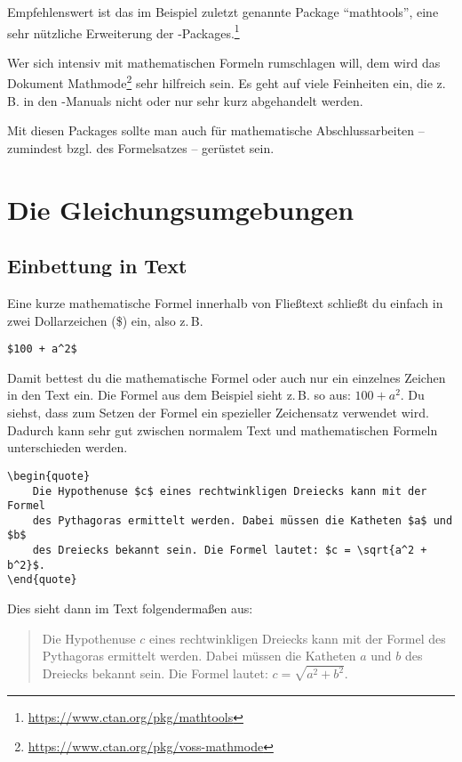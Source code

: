 Empfehlenswert ist das im Beispiel zuletzt genannte Package \enquote{mathtools}, eine sehr nützliche Erweiterung der \AmSmath-Packages.\footnote{\href{https://www.ctan.org/pkg/mathtools}{https://www.ctan.org/pkg/mathtools}}

Wer sich intensiv mit mathematischen Formeln rumschlagen will, dem wird das Dokument Mathmode\footnote{\href{https://www.ctan.org/pkg/voss-mathmode}{https://www.ctan.org/pkg/voss-mathmode}} sehr hilfreich sein. Es geht auf viele Feinheiten ein, die z.\,B. in den \AmSmath-Manuals nicht oder nur sehr kurz abgehandelt werden.

Mit diesen Packages sollte man auch für mathematische Abschlussarbeiten -- zumindest bzgl. des Formelsatzes -- gerüstet sein.

\section{Die Gleichungsumgebungen}
\subsection{Einbettung in Text}

Eine kurze mathematische Formel innerhalb von Fließtext schließt du einfach in zwei Dollarzeichen (\$) ein, also z.\,B.
\begin{lstlisting}
$100 + a^2$
\end{lstlisting}

Damit bettest du die mathematische Formel oder auch nur ein einzelnes Zeichen in den Text ein. Die Formel aus dem Beispiel sieht z.\,B. so aus: $100 + a^2$. Du siehst, dass zum Setzen der Formel ein spezieller Zeichensatz verwendet wird. Dadurch kann sehr gut zwischen normalem Text und mathematischen Formeln unterschieden werden.
\begin{lstlisting}
\begin{quote}
	Die Hypothenuse $c$ eines rechtwinkligen Dreiecks kann mit der Formel 
	des Pythagoras ermittelt werden. Dabei müssen die Katheten $a$ und $b$
	des Dreiecks bekannt sein. Die Formel lautet: $c = \sqrt{a^2 + b^2}$. 
\end{quote}
\end{lstlisting}

Dies sieht dann im Text folgendermaßen aus:

\begin{quote}
	Die Hypothenuse $c$ eines rechtwinkligen Dreiecks kann mit der Formel 
	des Pythagoras ermittelt werden. Dabei müssen die Katheten $a$ und $b$
	des Dreiecks bekannt sein.
	Die Formel lautet: $c = \sqrt{a^2 + b^2}$. 
\end{quote}

